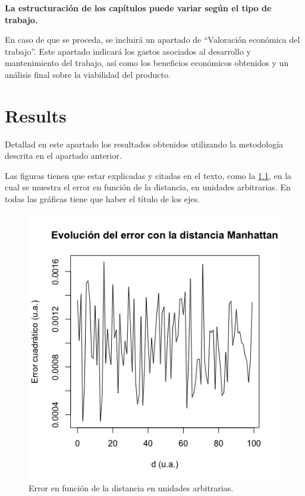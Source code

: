 \documentclass[ENG, BIB]{TFUOC}%
\begin{document}
 
\textbf{La estructuración de los capítulos puede variar según el tipo de trabajo.}  
 
En caso de que se proceda, se incluirá un apartado de “Valoración económica del trabajo”. Este apartado indicará los gastos asociados al desarrollo y mantenimiento del trabajo, así como los beneficios económicos obtenidos y un análisis final sobre la viabilidad del producto.



\chapter{Results}

Detallad en este apartado los resultados obtenidos utilizando la metodología descrita en el apartado anterior.

Las figuras tienen que estar explicadas y citadas en el texto, como la \ref{fig:my_label}, en la cual se muestra el error en función de la distancia, en unidades arbitrarias. En todas las gráficas tiene que haber el título de los ejes.

\begin{figure}[!htbp]
    \centering
    \includegraphics[width=7truecm]{Template/Rplotmanh.png}
    \caption{Error en función de la distancia en unidades arbitrarias.}
    \label{fig:my_label}
\end{figure}
\end{document}
